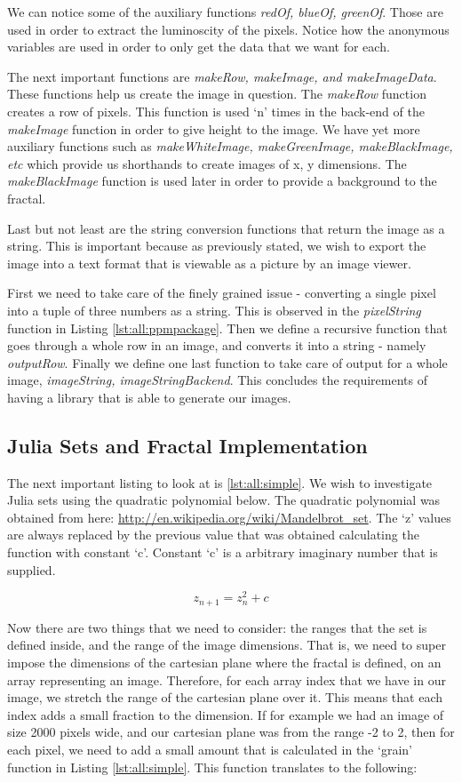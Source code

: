 We can notice some of the auxiliary functions \textit{redOf, blueOf, greenOf}. 
Those are used in order to extract the luminoscity of the pixels. Notice how
the anonymous variables are used in order to only get the data that we want for
each. 

The next important functions are \textit{makeRow, makeImage, and
makeImageData}. These functions help us create the image in question. The
\textit{makeRow} function creates a row of pixels. This function is used `n'
times in the back-end of the \textit{makeImage} function in order to give
height to the image. We have yet more auxiliary functions such as
\textit{makeWhiteImage, makeGreenImage, makeBlackImage, etc} which provide us
shorthands to create images of x, y dimensions. The \textit{makeBlackImage} 
function is used later in order to provide a background to the fractal. 

Last but not least are the string conversion functions that return the image
as a string. This is important because as previously stated, we wish to export
the image into a text format that is viewable as a picture by an image viewer.

First we need to take care of the finely grained issue - converting a single 
pixel into a tuple of three numbers as a string. This is observed in the
\textit{pixelString} function in Listing \ref{lst:all:ppmpackage}. Then we 
define a recursive function that goes through a whole row in an image, and 
converts it into a string - namely \textit{outputRow}. Finally we define one
last function to take care of output for a whole image, \textit{imageString, 
imageStringBackend}. This concludes the requirements of having a library that
is able to generate our images.

\subsection{Julia Sets and Fractal Implementation}

The next important listing to look at is \ref{lst:all:simple}. We wish to
investigate Julia sets using the quadratic polynomial below.  The quadratic
polynomial was obtained from here:
\url{http://en.wikipedia.org/wiki/Mandelbrot\_set}. The `z' values are always
replaced by the previous value that was obtained calculating the function with
constant `c'. Constant `c' is a arbitrary imaginary number that is supplied.

$$ z_{n+1} = z_{n}^{2} + c $$ 

Now there are two things that we need to consider: the ranges that the set is
defined inside, and the range of the image dimensions. That is, we need to
super impose the dimensions of the cartesian plane where the fractal is
defined, on an array representing an image. Therefore, for each array index
that we have in our image, we stretch the range of the cartesian plane over it.
This means that each index adds a small fraction to the dimension. If for
example we had an image of size 2000 pixels wide, and our cartesian plane was
from the range -2 to 2, then for each pixel, we need to add a small amount that
is calculated in the `grain' function in Listing \ref{lst:all:simple}. This 
function translates to the following: 

